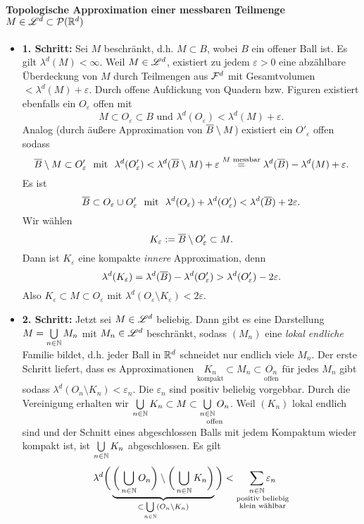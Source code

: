 \paragraph{Topologische Approximation einer messbaren Teilmenge $M\in \mathscr{L}^d \subset \mathcal{P}(\mathbb{R}^d)$}
\begin{itemize}
\item \textbf{1. Schritt:} Sei $M$ beschränkt, d.h. $M\subset B$, wobei $B$ ein offener Ball ist. Es gilt $\lambda^d(M)<\infty$. Weil $M \in \mathscr{L}^d$, existiert zu jedem $\varepsilon>0$ eine abzählbare Überdeckung von $M$ durch Teilmengen aus $\mathcal{F}^d$ mit Gesamtvolumen $< \lambda^d(M) +\varepsilon$. Durch offene Aufdickung von Quadern bzw. Figuren existiert ebenfalls ein $O_\varepsilon$ offen mit $$M \subset O_{\varepsilon} \subset B \text{\ \  und \ } \lambda^d(O_\varepsilon) < \lambda^d(M)+\varepsilon.$$ 
Analog (durch äußere Approximation von $\overline{B}\setminus M$) existiert ein $O'_\varepsilon$ offen sodass $$\overline{B}\setminus M\subset O'_\varepsilon \text{\ \  mit \ } \lambda^d(O'_\varepsilon)<\lambda^d(\overline{B}\setminus M)+\varepsilon\overset{M \text{ messbar}}= \lambda^d(\overline{B})-\lambda^d(M)+\varepsilon.$$ 
Es ist $$\overline{B}\subset O_\varepsilon \cup O'_\varepsilon \text{\ \  mit \ } \lambda^d(O_\varepsilon)+\lambda^d(O'_\varepsilon)<\lambda^d(\overline{B})+2\varepsilon.$$
Wir wählen $$K_\varepsilon := \overline{B} \setminus O'_\varepsilon \subset M.$$ Dann ist $K_\varepsilon$ eine kompakte \emph{innere} Approximation, denn $$\lambda^d(K_\varepsilon)=\lambda^d(\overline{B})-\lambda^d(O'_\varepsilon)>\lambda^d(O'_\varepsilon)-2\varepsilon.$$
Also $K_\varepsilon \subset M \subset O_\varepsilon$ mit $\lambda^d(O_\varepsilon \setminus K_\varepsilon) <2\varepsilon$.
\item \textbf{2. Schritt:} Jetzt sei $M\in\mathscr{L}^d$ beliebig. Dann gibt es eine Darstellung $M=\bigcup\limits_{n\in \mathbb{N}}M_n$ mit $M_n \in \mathscr{L}^d$ beschränkt, sodass $(M_n)$ eine \emph{lokal endliche} Familie bildet, d.h. jeder Ball in $\mathbb{R}^d$ schneidet nur endlich viele $M_n$. Der erste Schritt liefert, dass es Approximationen $\underset{\text{kompakt}}{K_n} \subset M_n \subset \underset{\text{offen}}{O_n}$ für jedes $M_n$ gibt sodass $\lambda^d (O_n \setminus K_n) < \varepsilon_n$. Die $\varepsilon_n$ sind positiv beliebig vorgebbar. Durch die Vereinigung erhalten wir ${\bigcup\limits_{n \in \mathbb{N}} K_n} \subset M \subset \underset{\text{offen}}{\bigcup\limits_{n \in \mathbb{N}} O_n}$. Weil $(K_n)$ lokal endlich sind und der Schnitt eines abgeschlossen Balls mit jedem Kompaktum wieder kompakt ist, ist $\bigcup\limits_{n\in \mathbb{N}} K_n$ abgeschlossen. Es gilt
$$
\lambda^d\bigg( \underbrace{\bigg(\bigcup_{n\in\mathbb{N}}O_n \bigg) \setminus \bigg( \bigcup_{n\in\mathbb{N}}K_n\bigg)}_{\subset \bigcup\limits_{n \in \mathbb{N}}(O_n \setminus K_n)}\bigg) < \underset{\substack{\text{positiv beliebig}\\\text{klein wählbar}}}{\sum_{n \in \mathbb{N}}\varepsilon_n}
$$
\end{itemize}

